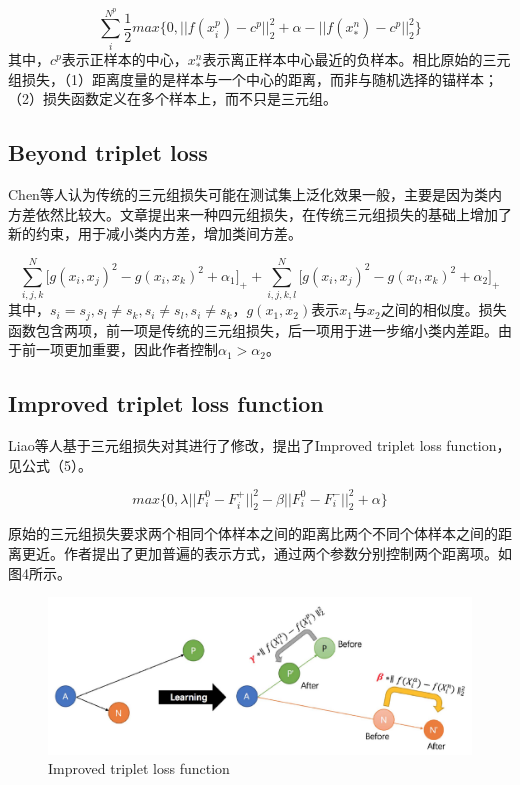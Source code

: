 \documentclass[a4paper]{article}
\begin{document}
    \begin{equation}
        \sum_i^{N^p} \frac{1}{2} max \big \{0,||f(x_i^p)-c^p||_2^2 + \alpha - ||f(x_*^n) - c^p||_2^2 \big\}
    \end{equation}
    其中，$c^p$表示正样本的中心，$x_*^n$表示离正样本中心最近的负样本。相比原始的三元组损失，（1）距离度量的是样本与一个中心的距离，而非与随机选择的锚样本；（2）损失函数定义在多个样本上，而不只是三元组。

    \subsection{Beyond triplet loss}

    Chen等人认为传统的三元组损失可能在测试集上泛化效果一般，主要是因为类内方差依然比较大。文章提出来一种四元组损失\cite{cvpr17beyond}，在传统三元组损失的基础上增加了新的约束，用于减小类内方差，增加类间方差。

    \begin{equation}
        \sum_{i,j,k}^N \big [g(x_i,x_j)^2 - g(x_i,x_k)^2 + \alpha_1 \big]_+ + \sum_{i,j,k,l}^N \big [g(x_i,x_j)^2 - g(x_l,x_k)^2 + \alpha_2 \big]_+
    \end{equation}
    其中，$s_i=s_j,s_l \neq s_k,s_i \neq s_l, s_i \neq s_k$，$g(x_1,x_2)$表示$x_1$与$x_2$之间的相似度。损失函数包含两项，前一项是传统的三元组损失，后一项用于进一步缩小类内差距。由于前一项更加重要，因此作者控制$\alpha_1>\alpha_2$。

    
    \subsection{Improved triplet loss function}

    Liao等人基于三元组损失对其进行了修改，提出了Improved triplet loss function\cite{iccv17triplet}，见公式（5）。

    \begin{equation}
        max \big \{ 0, \lambda || F_i^0 - F_i^+ ||_2^2 - \beta || F_i^0 - F_i^- ||_2^2 + \alpha \big \}
    \end{equation}

    原始的三元组损失要求两个相同个体样本之间的距离比两个不同个体样本之间的距离更近。作者提出了更加普遍的表示方式，通过两个参数分别控制两个距离项。如图4所示。


    \begin{figure}[H]
        \centering
        \includegraphics[width=0.7\linewidth]{./images/iccv17_tri.png}
        \caption{Improved triplet loss function}
        \label{fig:cvpr16_error_case}
    \end{figure}
\end{document}
